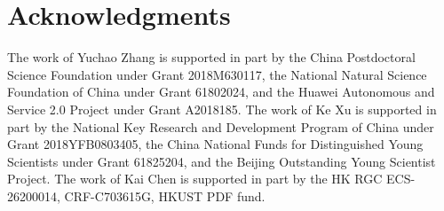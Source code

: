 \section*{Acknowledgments}
The work of Yuchao Zhang is supported in part by the China Postdoctoral Science Foundation under Grant 2018M630117, the National Natural Science Foundation of China under Grant 61802024, and the Huawei Autonomous and Service 2.0 Project under Grant A2018185. The work of Ke Xu is supported in part by the National Key Research and Development Program of China under Grant 2018YFB0803405, the China National Funds for Distinguished Young Scientists under Grant 61825204, and the Beijing Outstanding Young Scientist Project. The work of Kai Chen is supported in part by the HK RGC ECS-26200014, CRF-C703615G, HKUST PDF fund.